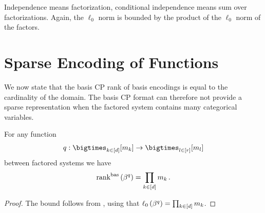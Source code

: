 \begin{example}
    Independence means factorization, conditional independence means sum over factorizations.
    Again, the $\ell_0$ norm is bounded by the product of the $\ell_0$ norm of the factors.
\end{example}




\section{Sparse Encoding of Functions}


We now state that the basis CP rank of basis encodings is equal to the cardinality of the domain.
The basis CP format can therefore not provide a sparse representation when the factored system contains many categorical variables.


\begin{theorem}
    \label{the:bencodingBasCP}
    For any function
    \[ \exfunction : \facstates \rightarrow  \secfacstates \]
    between factored systems we have
    \[ \mathrm{rank}^{\mathrm{bas}}\left(\beta^{q}\right) =  \prod_{k\in[d]}m_{k} \, . \]
\end{theorem}
\begin{proof}
    The bound follows from , using that $\ell_0\left(\beta^{q}\right)=\prod_{k\in[d]}m_{k}$.
\end{proof}


